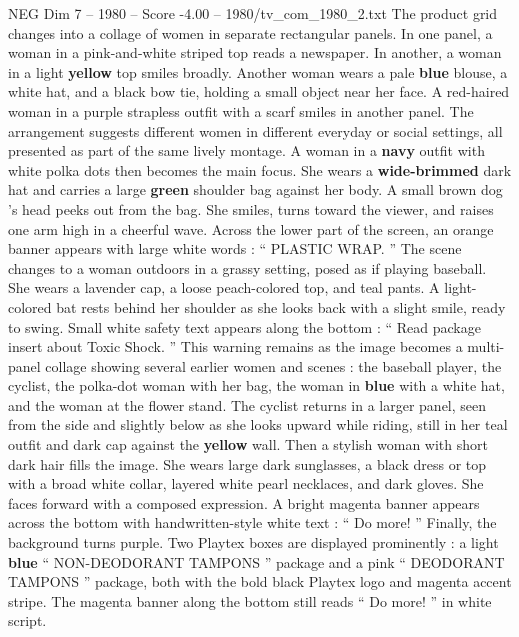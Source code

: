 \begin{textsample}{NEG Dim 7 – 1980 – Score -4.00 – 1980/tv\_com\_1980\_2.txt}
The product grid changes into a collage of women in separate rectangular panels.
In one panel, a woman in a pink-and-white striped top reads a newspaper.
In another, a woman in a light \textbf{yellow} top smiles broadly.
Another woman wears a pale \textbf{blue} blouse, a white hat, and a black bow tie, holding a small object near her face.
A red-haired woman in a purple strapless outfit with a scarf smiles in another panel.
The arrangement suggests different women in different everyday or social settings, all presented as part of the same lively montage.
A woman in a \textbf{navy} outfit with white polka dots then becomes the main focus.
She wears a \textbf{wide-brimmed} dark hat and carries a large \textbf{green} shoulder bag against her body.
A small brown dog ’s head peeks out from the bag.
She smiles, turns toward the viewer, and raises one arm high in a cheerful wave.
Across the lower part of the screen, an orange banner appears with large white words : “ PLASTIC WRAP. ” The scene changes to a woman outdoors in a grassy setting, posed as if playing baseball.
She wears a lavender cap, a loose peach-colored top, and teal pants.
A light-colored bat rests behind her shoulder as she looks back with a slight smile, ready to swing.
Small white safety text appears along the bottom : “ Read package insert about Toxic Shock. ” This warning remains as the image becomes a multi-panel collage showing several earlier women and scenes : the baseball player, the cyclist, the polka-dot woman with her bag, the woman in \textbf{blue} with a white hat, and the woman at the flower stand.
The cyclist returns in a larger panel, seen from the side and slightly below as she looks upward while riding, still in her teal outfit and dark cap against the \textbf{yellow} wall.
Then a stylish woman with short dark hair fills the image.
She wears large dark sunglasses, a black dress or top with a broad white collar, layered white pearl necklaces, and dark gloves.
She faces forward with a composed expression.
A bright magenta banner appears across the bottom with handwritten-style white text : “ Do more! ” Finally, the background turns purple.
Two Playtex boxes are displayed prominently : a light \textbf{blue} “ NON-DEODORANT TAMPONS ” package and a pink “ DEODORANT TAMPONS ” package, both with the bold black Playtex logo and magenta accent stripe.
The magenta banner along the bottom still reads “ Do more! ” in white script.

\end{textsample}
